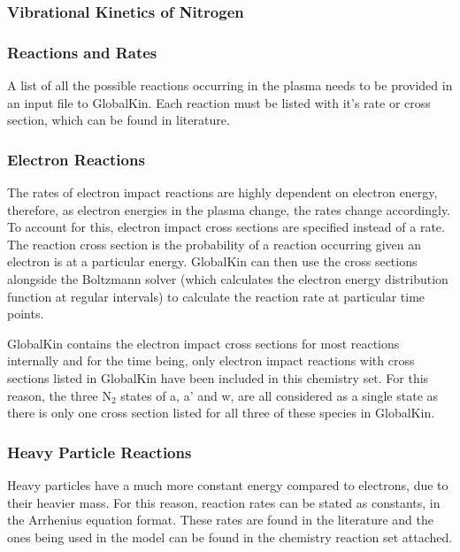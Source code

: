 \documentclass[11pt, oneside]{article}   	%
\begin{document}
\subsubsection*{Vibrational Kinetics of Nitrogen}



\subsubsection{Reactions and Rates}

A list of all the possible reactions occurring in the plasma needs to be provided in an input file to GlobalKin.
Each reaction must be listed with it's rate or cross section, which can be found in literature.

\subsubsection*{Electron Reactions}
The rates of electron impact reactions are highly dependent on electron energy, therefore, as electron energies in the plasma change, the rates change accordingly.
To account for this, electron impact cross sections are specified instead of a rate.
The reaction cross section is the probability of a reaction occurring given an electron is at a particular energy.
GlobalKin can then use the cross sections alongside the Boltzmann solver (which calculates the electron energy distribution function at regular intervals) to calculate the reaction rate at particular time points.

GlobalKin contains the electron impact cross sections for most reactions internally and for the time being, only electron impact reactions with cross sections listed in GlobalKin have been included in this chemistry set.
For this reason, the three N$_2$ states of a, a' and w, are all considered as a single state as there is only one cross section listed for all three of these species in GlobalKin.

\subsubsection*{Heavy Particle Reactions}
Heavy particles have a much more constant energy compared to electrons, due to their heavier mass. 
For this reason, reaction rates can be stated as constants, in the Arrhenius equation format.
These rates are found in the literature and the ones being used in the model can be found in the chemistry reaction set attached.
\end{document}
